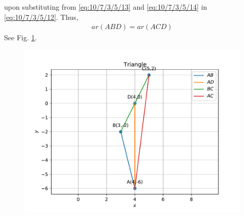 \documentclass[12pt]{article}
\begin{document}
upon substituting from \eqref{eq:10/7/3/5/13} and \eqref{eq:10/7/3/5/14} in \eqref{eq:10/7/3/5/12}.
Thus,
\begin{align}
ar(ABD)=ar(ACD)
\end{align}
See Fig. 
\ref{fig:10/7/3/5/}.
\begin{figure}[h!]
\centering
\includegraphics[width=\columnwidth]{chapters/10/7/3/5/figs/fig.pdf}
\caption{}
\label{fig:10/7/3/5/}
\end{figure} 
\end{document}
